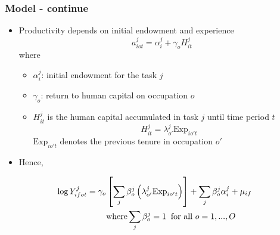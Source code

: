 \documentclass[11pt]{beamer}
\begin{document}
\begin{frame}
	\frametitle{Model - continue}
	\begin{itemize}
		\item Productivity depends on initial endowment and experience  
		\begin{equation}
			a_{iot}^j = \alpha_{i}^j + \gamma_o H^j_{it}
		\end{equation}
		where
		\begin{itemize}
			\item $\alpha_{i}^j$: initial endowment for the task $j$
			\item $\gamma_o$: return to human capital on occupation $o$ 
			\item$H_{it}^j$ is the human capital accumulated in task $j$ until time period $t$
			\begin{equation}
				H_{it}^j = \lambda_{o'}^j \text{Exp}_{io't}
			\end{equation}
			$\text{Exp}_{io't}$ denotes the previous tenure in occupation $o'$ %
		\end{itemize}
		

		\item Hence,
	\end{itemize}
	\begin{align}
		\log{Y_{ifot}^j} = \gamma_o&\left[ \sum_j \beta_{o}^j \left(\lambda_{o'}^j \text{Exp}_{io't} \right) \right] + \sum_j \beta_{o}^j \alpha_{i}^j + \mu_{if}\\
		&\text{where} \sum_{j} \beta_{o}^j = 1 \;\;\text{for all }o=1,...,O \notag
	\end{align}
\end{frame}
\end{document}
